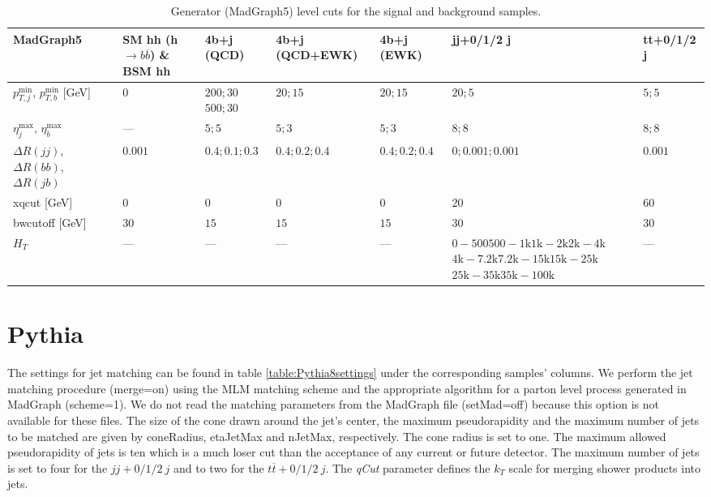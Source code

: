 \begin{table}[h]
	\centering
		\caption{Generator (MadGraph5) level cuts for the signal and background samples.}
		\label{table:MG5cuts}
	\begin{tabular}{lp{17mm}p{15mm}p{20mm}p{15mm}p{20mm}l}
		\toprule 
		\textbf{MadGraph5}& SM hh (h$\rightarrow b\overline{b}$) \& BSM hh& 4b+j (QCD) & 4b+j (QCD+EWK) & 4b+j (EWK) & jj+0/1/2 j & tt+0/1/2 j \\
		\midrule
		$p_{T,j}^{\text{min}}$, $p_{T,b}^{\text{min}}$ [GeV]& $0$ & $200;30$\newline $500;30$ & $20;15$ & $20;15$ & $20;5$ & $5;5$\\
		\rowcolor{black!7} $\eta_j^{\text{max}}$, $\eta_b^{\text{max}}$ & --- & $5;5$ & $5;3$ & $5;3$ & $8;8$ & $8;8$\\
		$\Delta R(jj)$, $\Delta R(bb)$, $\Delta R(jb)$& $0.001$ & $0.4;0.1;0.3$ & $0.4;0.2;0.4$ & $0.4;0.2;0.4$ & $0;0.001;0.001$ & $0.001$ \\
		\rowcolor{black!7} xqcut [GeV]& $0$ & $0$ & $0$ & $0$ & $20$ & $60$ \\
		bwcutoff [GeV]& $30$ & $15$ & $15$ & $15$ & $30$ & $30$\\
		\rowcolor{black!7} $H_T$ & --- & --- & --- & --- & $0-500$\newline $500-1\text{k}$\newline $1\text{k}-2\text{k}$\newline $2\text{k}-4\text{k}$\newline $4\text{k}-7.2\text{k}$\newline $7.2\text{k}-15\text{k}$\newline $15\text{k}-25\text{k}$\newline $25\text{k}-35\text{k}$\newline $35\text{k}-100\text{k}$ & ---\\
		\bottomrule
	\end{tabular}
\end{table}

\section{Pythia}
\label{sec:Pythia_par}

The settings for jet matching can be found in table \ref{table:Pythia8settings} under the corresponding samples' columns. We perform the jet matching procedure (merge=on) using the MLM matching scheme and the appropriate algorithm for a parton level process generated in MadGraph (scheme=1). We do not read the matching parameters from the MadGraph file (setMad=off) because this option is not available for these files. The size of the cone drawn around the jet's center, the maximum pseudorapidity and the maximum number of jets to be matched are given by coneRadius, etaJetMax and nJetMax, respectively. The cone radius is set to one. The maximum allowed pseudorapidity of jets is ten which is a much loser cut than the acceptance of any current or future detector. The maximum number of jets is set to four for the $jj+0/1/2 ~j$ and to two for the $t\overline{t}+0/1/2 ~j$. The \textit{qCut} parameter defines the $k_T$ scale for merging shower products into jets.

